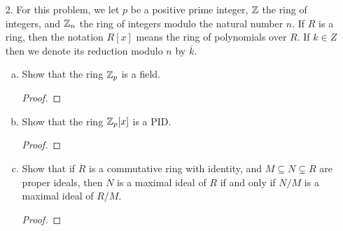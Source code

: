 \begin{itemize}
\begin{enumerate}[(a)]
    \item Show how the orbit-stabilizer theorem, applied to the appropriate group action, implies Cayley’s theorem: If $|G| = n$, then there is an embedding $G \hookrightarrow S_n$.
    \begin{proof}

    \end{proof}
    
    \item Show how the orbit-stabilizer theorem, applied to the appropriate group action, implies that the size of any conjugacy class of $G$ divides $|G|$.
    \begin{proof}

    \end{proof}
    
    \item Prove that if $|G| = p^n$, then $|Z(G)| > 1$, where $Z(G)$ is the center of $G$.
    \begin{proof}

    \end{proof}
\end{enumerate}










\item[2.] For this problem, we let $p$ be a positive prime integer, $\mathbb{Z}$ the ring of integers, and $\mathbb{Z}_n$ the ring of integers modulo the natural number $n$. If $R$ is a ring, then the notation $R[x]$ means the ring of polynomials over $R$. If $k \in Z$ then we denote its reduction modulo $n$ by $\overline{k}$.

\begin{enumerate}[(a)]
    \item Show that the ring $\mathbb{Z}_p$ is a field.
    \begin{proof}

    \end{proof}
    
    \item Show that the ring $\mathbb{Z}_p[x]$ is a PID.
    \begin{proof}

    \end{proof}
    
    \item Show that if $R$ is a commutative ring with identity, and $M \subseteq N \subsetneq R$ are proper ideals, then $N$ is a maximal ideal of $R$ if and only if $N/M$ is a maximal ideal of $R/M$.
    \begin{proof}


\end{proof}
\end{enumerate}
\end{itemize}
